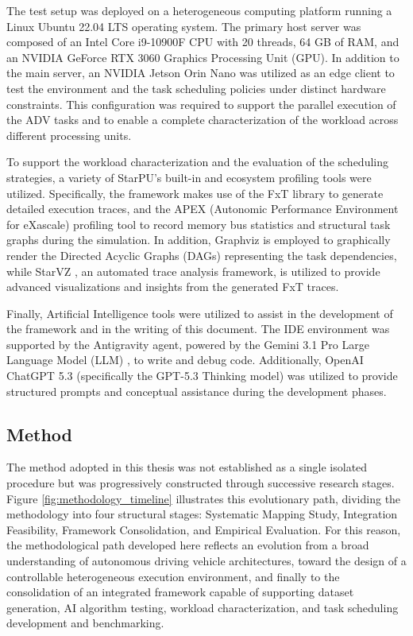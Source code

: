 The test setup was deployed on a heterogeneous computing platform running a Linux Ubuntu 22.04 LTS operating system. The primary host server was composed of an Intel Core i9-10900F CPU with 20 threads, 64 GB of RAM, and an NVIDIA GeForce RTX 3060 Graphics Processing Unit (GPU). In addition to the main server, an NVIDIA Jetson Orin Nano was utilized as an edge client to test the environment and the task scheduling policies under distinct hardware constraints. This configuration was required to support the parallel execution of the ADV tasks and to enable a complete characterization of the workload across different processing units.

To support the workload characterization and the evaluation of the scheduling strategies, a variety of StarPU's built-in and ecosystem profiling tools were utilized. Specifically, the framework makes use of the FxT library to generate detailed execution traces, and the APEX (Autonomic Performance Environment for eXascale) \cite{Huck2015APEX} profiling tool to record memory bus statistics and structural task graphs during the simulation. In addition, Graphviz \cite{Gansner2000Graphviz} is employed to graphically render the Directed Acyclic Graphs (DAGs) representing the task dependencies, while StarVZ \cite{Pinto2021StarVZ}, an automated trace analysis framework, is utilized to provide advanced visualizations and insights from the generated FxT traces.

Finally, Artificial Intelligence tools were utilized to assist in the development of the framework and in the writing of this document. The IDE environment was supported by the Antigravity agent, powered by the Gemini 3.1 Pro Large Language Model (LLM) \cite{Reid2024Gemini15}, to write and debug code. Additionally, OpenAI ChatGPT 5.3 (specifically the GPT-5.3 Thinking model) \cite{OpenAI2023GPT4} was utilized to provide structured prompts and conceptual assistance during the development phases.

\subsection{Method}

The method adopted in this thesis was not established as a single isolated procedure but was progressively constructed through successive research stages. Figure \ref{fig:methodology_timeline} illustrates this evolutionary path, dividing the methodology into four structural stages: Systematic Mapping Study, Integration Feasibility, Framework Consolidation, and Empirical Evaluation. For this reason, the methodological path developed here reflects an evolution from a broad understanding of autonomous driving vehicle architectures, toward the design of a controllable heterogeneous execution environment, and finally to the consolidation of an integrated framework capable of supporting dataset generation, AI algorithm testing, workload characterization, and task scheduling development and benchmarking.

